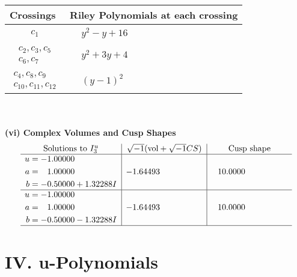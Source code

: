 \documentclass[1p]{elsarticle_modified}
\theoremstyle{definition}
\newcommand{\I}{\sqrt{-1}}
\begin{document}
\begin{tabular}{m{50pt}|m{274pt}}
Crossings & \hspace{64pt}Riley Polynomials at each crossing \\
\hline $$\begin{aligned}c_{1}\end{aligned}$$&$\begin{aligned}
&y^2- y+16
\end{aligned}$\\
\hline $$\begin{aligned}c_{2},c_{3},c_{5}\\c_{6},c_{7}\end{aligned}$$&$\begin{aligned}
&y^2+3 y+4
\end{aligned}$\\
\hline $$\begin{aligned}c_{4},c_{8},c_{9}\\c_{10},c_{11},c_{12}\end{aligned}$$&$\begin{aligned}
&(y-1)^2
\end{aligned}$\\
\hline
\end{tabular}\\~\\
\newpage\flushleft \textbf{(vi) Complex Volumes and Cusp Shapes}
$$\begin{array}{c|c|c}  
\text{Solutions to }I^u_{3}& \I (\text{vol} + \sqrt{-1}CS) & \text{Cusp shape}\\
 \hline 
\begin{aligned}
u &= -1.00000\phantom{ +0.000000I} \\
a &= \phantom{-}1.00000\phantom{ +0.000000I} \\
b &= -0.50000 + 1.32288 I\end{aligned}
 & -1.64493\phantom{ +0.000000I} & \phantom{-}10.0000\phantom{ +0.000000I} \\ \hline\begin{aligned}
u &= -1.00000\phantom{ +0.000000I} \\
a &= \phantom{-}1.00000\phantom{ +0.000000I} \\
b &= -0.50000 - 1.32288 I\end{aligned}
 & -1.64493\phantom{ +0.000000I} & \phantom{-}10.0000\phantom{ +0.000000I}\\
 \hline 
 \end{array}$$\newpage
\newpage\renewcommand{\arraystretch}{1}
\centering \section*{ IV. u-Polynomials}
\end{document}
